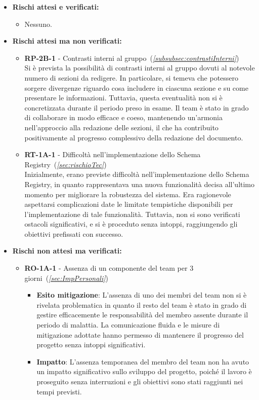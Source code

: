 \begin{itemize}
    \item \textbf{Rischi attesi e verificati:}
        \begin{itemize}
            \item Nessuno.
        \end{itemize}
    \item \textbf{Rischi attesi ma non verificati:}
        \begin{itemize}
            \item \textbf{RP-2B-1} - Contrasti interni al gruppo~(\textit{\ref{subsubsec:contrastiInterni}}) \\
            Si è prevista la possibilità di contrasti interni al gruppo dovuti al notevole numero di sezioni da redigere. In particolare, si temeva che potessero sorgere divergenze riguardo cosa includere in ciascuna sezione e su come presentare le informazioni. Tuttavia, questa eventualità non si è concretizzata durante il periodo preso in esame. Il team è stato in grado di collaborare in modo efficace e coeso, mantenendo un'armonia nell'approccio alla redazione delle sezioni, il che ha contribuito positivamente al progresso complessivo della redazione del documento.
            \item \textbf{RT-1A-1} - Difficoltà nell’implementazione dello Schema Registry~(\textit{\ref{sec:rischioTec}}) \\
            Inizialmente, erano previste difficoltà nell'implementazione dello Schema Registry, in quanto rappresentava una nuova funzionalità decisa all'ultimo momento per migliorare la robustezza del sistema. Era ragionevole aspettarsi complicazioni date le limitate tempistiche disponibili per l'implementazione di tale funzionalità. Tuttavia, non si sono verificati ostacoli significativi, e si è proceduto senza intoppi, raggiungendo gli obiettivi prefissati con successo.
        \end{itemize}
    \item \textbf{Rischi non attesi ma verificati:}
        \begin{itemize}
            \item \textbf{RO-1A-1} - Assenza di un componente del team per 3 giorni~(\textit{\ref{sec:ImpPersonali}})
                \begin{itemize}
                    \item \textbf{Esito mitigazione}: L'assenza di uno dei membri del team non si è rivelata problematica in quanto il resto del team è stato in grado di gestire efficacemente le responsabilità del membro assente durante il periodo di malattia. La comunicazione fluida e le misure di mitigazione adottate hanno permesso di mantenere il progresso del progetto senza intoppi significativi.
                    \item \textbf{Impatto}: L'assenza temporanea del membro del team non ha avuto un impatto significativo sullo sviluppo del progetto, poiché il lavoro è proseguito senza interruzioni e gli obiettivi sono stati raggiunti nei tempi previsti.
                \end{itemize}
        \end{itemize}
\end{itemize}


